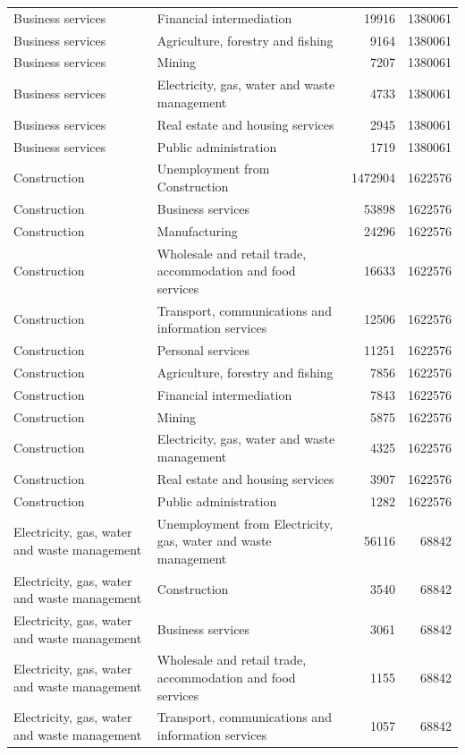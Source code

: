 \begin{longtable}{llrr}
Business services & Financial intermediation & 19916 & 1380061 \\
Business services & Agriculture, forestry and fishing & 9164 & 1380061 \\
Business services & Mining & 7207 & 1380061 \\
Business services & Electricity, gas, water and waste management & 4733 & 1380061 \\
Business services & Real estate and housing services & 2945 & 1380061 \\
Business services & Public administration & 1719 & 1380061 \\
Construction & Unemployment from Construction & 1472904 & 1622576 \\
Construction & Business services & 53898 & 1622576 \\
Construction & Manufacturing & 24296 & 1622576 \\
Construction & Wholesale and retail trade, accommodation and food services & 16633 & 1622576 \\
Construction & Transport, communications and information services & 12506 & 1622576 \\
Construction & Personal services & 11251 & 1622576 \\
Construction & Agriculture, forestry and fishing & 7856 & 1622576 \\
Construction & Financial intermediation & 7843 & 1622576 \\
Construction & Mining & 5875 & 1622576 \\
Construction & Electricity, gas, water and waste management & 4325 & 1622576 \\
Construction & Real estate and housing services & 3907 & 1622576 \\
Construction & Public administration & 1282 & 1622576 \\
Electricity, gas, water and waste management & Unemployment from Electricity, gas, water and waste management & 56116 & 68842 \\
Electricity, gas, water and waste management & Construction & 3540 & 68842 \\
Electricity, gas, water and waste management & Business services & 3061 & 68842 \\
Electricity, gas, water and waste management & Wholesale and retail trade, accommodation and food services & 1155 & 68842 \\
Electricity, gas, water and waste management & Transport, communications and information services & 1057 & 68842 \\

\end{longtable}

